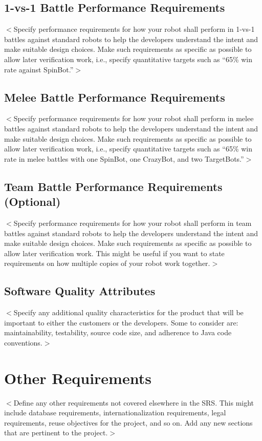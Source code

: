 \documentclass{scrreprt}
\begin{document}
\section{1-vs-1 Battle Performance Requirements}
$<$Specify performance requirements for how your robot shall perform in 1-vs-1 battles against standard robots to help the developers understand the intent and make suitable design choices. Make such requirements as specific as possible to allow later verification work, i.e., specify quantitative targets such as ``65\% win rate against SpinBot.''$>$

\section{Melee Battle Performance Requirements}
$<$Specify performance requirements for how your robot shall perform in melee battles against standard robots to help the developers understand the intent and make suitable design choices. Make such requirements as specific as possible to allow later verification work, i.e., specify quantitative targets such as ``65\% win rate in melee battles with one SpinBot, one CrazyBot, and two TargetBots.''$>$

\section{Team Battle Performance Requirements (Optional)}
$<$Specify performance requirements for how your robot shall perform in team battles against standard robots to help the developers understand the intent and make suitable design choices. Make such requirements as specific as possible to allow later verification work. This might be useful if you want to state requirements on how multiple copies of your robot work together.$>$

\section{Software Quality Attributes}
$<$Specify any additional quality characteristics for the product that will be important to either the customers or the developers. Some to consider are: maintainability, testability, source code size, and adherence to Java code conventions.$>$

\chapter{Other Requirements}
$<$Define any other requirements not covered elsewhere in the SRS. This might include database requirements, internationalization requirements, legal requirements, reuse objectives for the project, and so on. Add any new sections that are pertinent to the project.$>$
\end{document}
